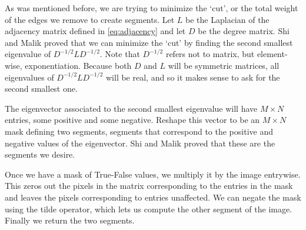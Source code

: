 As was mentioned before, we are trying to minimize the `cut', or the total weight of the edges we remove to create segments. 
Let $L$ be the Laplacian of the adjacency matrix defined in \ref{eq:adjacency} and let $D$ be the degree matrix.
Shi and Malik proved that we can minimize the `cut' by finding the second smallest eigenvalue of $D^{-1/2}LD^{-1/2}$.  Note that $D^{-1/2}$ refers not to matrix, but element-wise, exponentiation.
Because both $D$ and $L$ will be symmetric matrices, all eigenvalues of $D^{-1/2}LD^{-1/2}$ will be real, and so it makes sense to ask for the second smallest one.

The eigenvector associated to the second smallest eigenvalue will have $M \times N$ entries, some positive and some negative. 
Reshape this vector to be an $M \times N$ mask defining two segments, segments that correspond to the positive and negative values of the eigenvector.
Shi and Malik proved that these are the segments we desire. 

Once we have a mask of True-False values, we multiply it by the image entrywise. This zeros out the pixels in the matrix corresponding to the  entries in the mask and leaves the pixels corresponding to  entries unaffected. We can negate the mask using the tilde operator, which lets us compute the other segment of the image. Finally we return the two segments.

